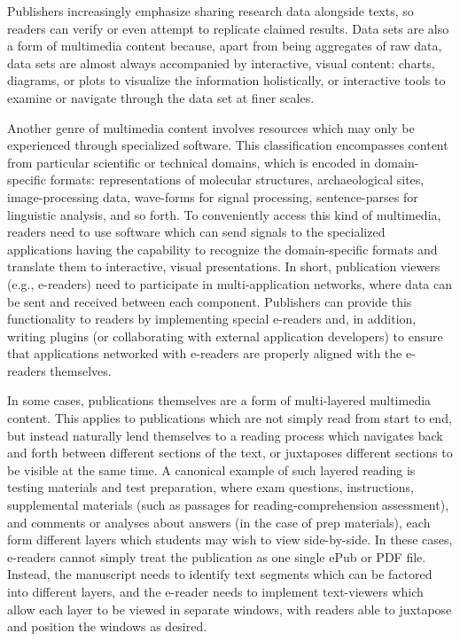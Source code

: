 \documentclass[10pt,letterpaper]{article}
\begin{document}
{{\begin{description}[leftmargin=2pt,
	labelindent=-2pt,labelsep=12pt]
\item[Data Sets and Data Visualization]  Publishers 
increasingly emphasize sharing research data alongside 
texts, so readers can verify or even attempt to 
replicate claimed results.  Data sets are also a form 
of multimedia content because, apart from being aggregates 
of raw data, data sets are almost always accompanied 
by interactive, visual content: charts, diagrams, or 
plots to visualize the information holistically, or 
interactive tools to examine or navigate through the 
data set at finer scales.  

\item[Application Networks]  Another genre of multimedia 
content involves resources which may only be experienced 
through specialized software.  This classification encompasses 
content from particular scientific or technical domains, 
which is encoded in domain-specific formats: representations 
of molecular structures, archaeological sites, image-processing 
data, wave-forms for signal processing, sentence-parses for 
linguistic analysis, and so forth.  To conveniently access 
this kind of multimedia, readers need to use software 
which can send signals to the specialized applications 
having the capability to recognize the domain-specific 
formats and translate them to interactive, 
visual presentations.  In short, publication viewers 
(e.g., e-readers) need to participate in multi-application 
networks, where data can be sent and received between 
each component.  Publishers can provide this 
functionality to readers by implementing special 
e-readers and, in addition, writing plugins 
(or collaborating with external application developers) 
to ensure that applications networked with e-readers 
are properly aligned with the e-readers themselves.

\item[Publications-as-Applications]  In some 
cases, publications themselves are a form of 
multi-layered multimedia content.  This applies 
to publications which are not simply read from 
start to end, but instead naturally lend 
themselves to a reading process which navigates 
back and forth between different sections of 
the text, or juxtaposes different sections to be 
visible at the same time.  A canonical example 
of such layered reading is testing materials 
and test preparation, where exam questions, 
instructions, supplemental materials (such 
as passages for reading-comprehension 
assessment), and comments or analyses about 
answers (in the case of prep materials), 
each form different layers which 
students may wish to view side-by-side.  
In these cases, e-readers cannot simply 
treat the publication as one single ePub 
or PDF file.  Instead, the manuscript needs 
to identify text segments which can be factored 
into different layers, and the e-reader 
needs to implement text-viewers which allow 
each layer to be viewed in separate windows, 
with readers able to juxtapose and position the 
windows as desired. 
\end{description}\vspace{-2em}
}


}
\end{document}

